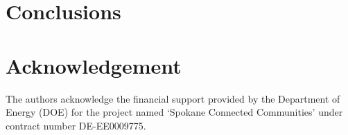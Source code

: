 \documentclass{article}
\begin{document}
\section{Conclusions}


\section{Acknowledgement}
The authors acknowledge the financial support provided by the Department of Energy (DOE)  for the project named `Spokane Connected Communities' under contract number DE-EE0009775. 
\end{document}

